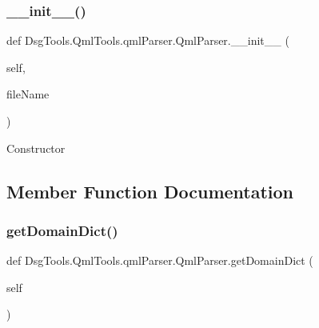 \subsubsection{\texorpdfstring{\+\_\+\+\_\+init\+\_\+\+\_\+()}{\_\_init\_\_()}}
{\footnotesize\ttfamily def Dsg\+Tools.\+Qml\+Tools.\+qml\+Parser.\+Qml\+Parser.\+\_\+\+\_\+init\+\_\+\+\_\+ (\begin{DoxyParamCaption}\item[{}]{self,  }\item[{}]{file\+Name }\end{DoxyParamCaption})}

\begin{DoxyVerb}Constructor
\end{DoxyVerb}
 

\subsection{Member Function Documentation}
\mbox{\label{class_dsg_tools_1_1_qml_tools_1_1qml_parser_1_1_qml_parser_ac9fb4cabff860abb0988781310f19ea9}} 
\subsubsection{\texorpdfstring{get\+Domain\+Dict()}{getDomainDict()}}
{\footnotesize\ttfamily def Dsg\+Tools.\+Qml\+Tools.\+qml\+Parser.\+Qml\+Parser.\+get\+Domain\+Dict (\begin{DoxyParamCaption}\item[{}]{self }\end{DoxyParamCaption})}

